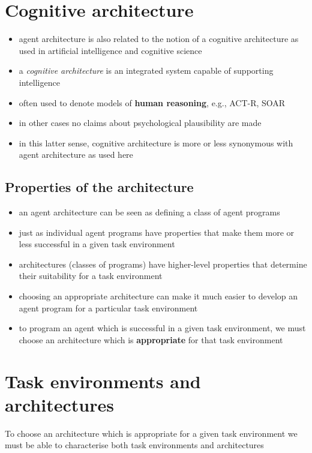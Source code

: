 \documentclass{article}
\begin{document}
\section{Cognitive architecture}

\begin{itemize}
  \item agent architecture is also related to the notion of a cognitive architecture as used in artificial intelligence and cognitive science 
  \item a \textit{cognitive architecture} is an integrated system capable of supporting intelligence 
  \item often used to denote models of \textbf{human reasoning}, e.g., ACT-R, SOAR 
  \item in other cases no claims about psychological plausibility are made 
  \item in this latter sense, cognitive architecture is more or less synonymous with agent architecture as used here
\end{itemize}

\subsection{Properties of the architecture}

\begin{itemize}
  \item an agent architecture can be seen as defining a class of agent programs 
  \item just as individual agent programs have properties that make them more or less successful in a given task environment 
  \item architectures (classes of programs) have higher-level properties that determine their suitability for a task environment 
  \item choosing an appropriate architecture can make it much easier to develop an agent program for a particular task environment
  \item to program an agent which is successful in a given task environment, we must choose an architecture which is \textbf{appropriate} for that task environment
\end{itemize}

\pagebreak

\section{Task environments and architectures}
\begin{flushleft}
To choose an architecture which is appropriate for a given task environment we must be able to characterise both task environments and architectures
\end{flushleft}
\end{document}

